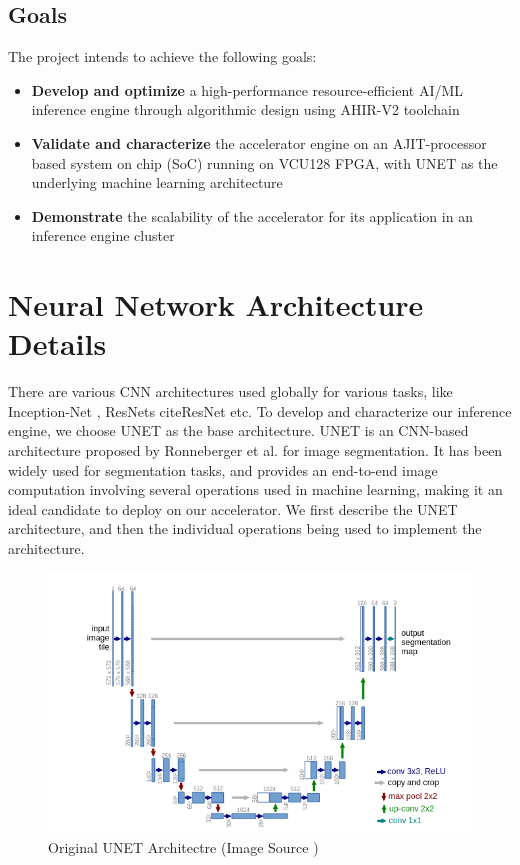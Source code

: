 \documentclass[a4paper,12pt, final]{report}
\begin{document}
\section{Goals}

The project intends to achieve the following goals:

\begin{itemize}

	\item {\bf Develop and optimize} a high-performance resource-efficient AI/ML inference engine through algorithmic design using AHIR-V2 toolchain
	\item {\bf Validate and characterize} the accelerator engine on an AJIT-processor based system on chip (SoC) running on VCU128 FPGA, with UNET as the underlying machine learning architecture
	\item {\bf Demonstrate} the scalability of the accelerator for its application in an inference engine cluster
\end{itemize}

\chapter{Neural Network Architecture Details}\label{Chap:2}

There are various CNN architectures used globally for various tasks, like Inception-Net \cite{GoogleNet}, ResNets cite{ResNet} etc. To develop and characterize our inference engine, we choose UNET as the base architecture. UNET is an CNN-based architecture proposed by Ronneberger et al. for image segmentation\cite{UNET}. It has been widely used for segmentation tasks, and provides an end-to-end image computation involving several operations used in machine learning, making it an ideal candidate to deploy on our accelerator. We first describe the UNET architecture, and then the individual operations being used to implement the architecture.
\\

\begin{figure}[h!]
    \centering
    \includegraphics[width=\textwidth]{Screenshot from 2022-10-12 10-40-59.png}
	\caption{Original UNET Architectre (Image Source \cite{UNET})}
    \label{fig:UNET}
\end{figure}
\end{document}
